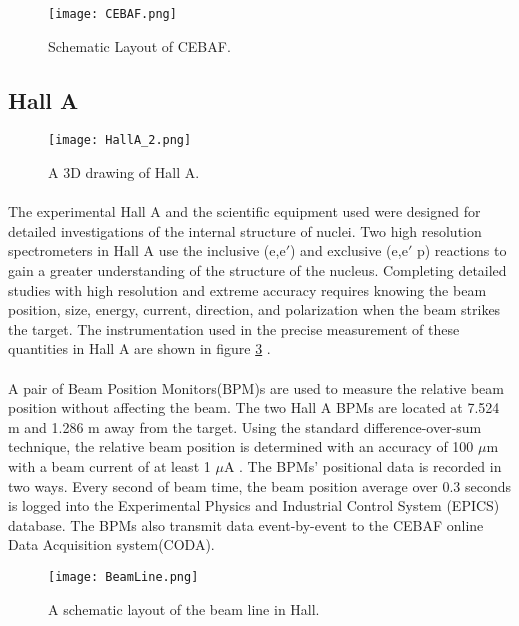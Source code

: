	\begin{figure}[h]
	\centering
	 \caption{Schematic Layout of CEBAF. }
	 \label{CEBAF}
	 \texttt{[image: CEBAF.png]} 
	 \end{figure} 
	 
	 \subsection{Hall A}
	 
	\begin{figure}[H]
		\centering
		\caption{A 3D drawing of Hall A. }
		\label{HallA}
		\texttt{[image: HallA\_2.png]} 
	\end{figure} 	 
	 
	 \paragraph{}The experimental Hall A and the scientific equipment used were designed for detailed investigations of the internal structure of nuclei. Two high resolution spectrometers in Hall A use the inclusive (e,e$\prime$) and exclusive (e,e$\prime$ p) reactions to gain a greater understanding of the structure of the nucleus. Completing detailed studies with high resolution and extreme accuracy requires knowing the beam position, size, energy, current, direction, and polarization when the beam strikes the target. The instrumentation used in the precise measurement of these quantities in Hall A  are shown in figure \ref{BeamLine} \cite{HallA}.

	 \paragraph{} A pair of Beam Position Monitors(BPM)s are used to measure the relative beam position without affecting the beam. The two Hall A BPMs are located at 7.524 m and 1.286 m away from the target. Using the standard difference-over-sum technique, the relative beam position is determined with an accuracy of 100 $\mu$m with a beam current of at least 1 $\mu$A \cite{HallA}. The BPMs' positional data is recorded in two ways. Every second of beam time, the beam position average over 0.3 seconds is logged into the Experimental Physics and Industrial Control System (EPICS) database. The BPMs also transmit data event-by-event to the CEBAF online Data Acquisition system(CODA).
	 	 	 
 	 	\begin{figure}[H]
 	 		\centering
 	 		\caption{A schematic layout of the beam line in Hall. \cite{HallA} }
	 	 	\label{BeamLine}
	 	 	\texttt{[image: BeamLine.png]} 
	 	 \end{figure} 	
	 	 	
